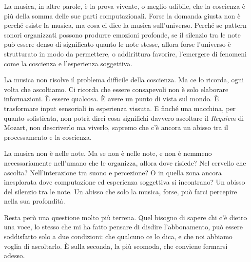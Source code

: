 La musica, in altre parole, \`{e} la prova vivente, o meglio udibile, che la coscienza \`{e} pi\`{u} della somma delle sue parti computazionali. Forse la domanda giusta non \`{e} perch\'{e} esiste la musica, ma cosa ci dice la musica sull'universo. Perch\'{e} se pattern sonori organizzati possono produrre emozioni profonde, se il silenzio tra le note pu\`{o} essere denso di significato quanto le note stesse, allora forse l'universo \`{e} strutturato in modo da permettere, o addirittura favorire, l'emergere di fenomeni come la coscienza e l'esperienza soggettiva.

La musica non risolve il problema difficile della coscienza. Ma ce lo ricorda, ogni volta che ascoltiamo. Ci ricorda che essere consapevoli non \`{e} solo elaborare informazioni. \`{E} essere qualcosa. \`{E} avere un punto di vista sul mondo. \`{E} trasformare input sensoriali in esperienza vissuta. E finch\'{e} una macchina, per quanto sofisticata, non potr\`{a} dirci cosa significhi davvero ascoltare il \textit{Requiem} di Mozart, non descriverlo ma viverlo, sapremo che c'\`{e} ancora un abisso tra il processamento e la coscienza.

La musica non \`{e} nelle note. Ma se non \`{e} nelle note, e non \`{e} nemmeno necessariamente nell'umano che le organizza, allora dove risiede? Nel cervello che ascolta? Nell'interazione tra suono e percezione? O in quella zona ancora inesplorata dove computazione ed esperienza soggettiva si incontrano? Un abisso del silenzio tra le note. Un abisso che solo la musica, forse, pu\`{o} farci percepire nella sua profondit\`{a}.

Resta per\`{o} una questione molto pi\`{u} terrena. Quel bisogno di sapere chi c'\`{e} dietro una voce, lo stesso che mi ha fatto pensare di disdire l'abbonamento, pu\`{o} essere soddisfatto solo a due condizioni: che qualcuno ce lo dica, e che noi abbiamo voglia di ascoltarlo. \`{E} sulla seconda, la pi\`{u} scomoda, che conviene fermarsi adesso.